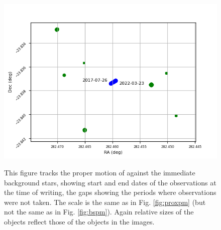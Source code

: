 \begin{figure}[!htbp]
\begin{center}
\includegraphics[scale=0.7]{images/pmross.png} \\
\end{center}
\caption{This figure tracks the proper motion of {\ross} against the immediate
background stars, showing start and end dates of the observations at the time
of writing, the gaps showing the periods where observations were not taken.
The scale is the same as in Fig. \ref{fig:proxpm} (but not the same as in Fig.
\ref{fig:bspm}). Again relative sizes of the objects reflect those of the
objects in the images.} \protect\label{fig:rosspm}
\end{figure}

\clearpage
